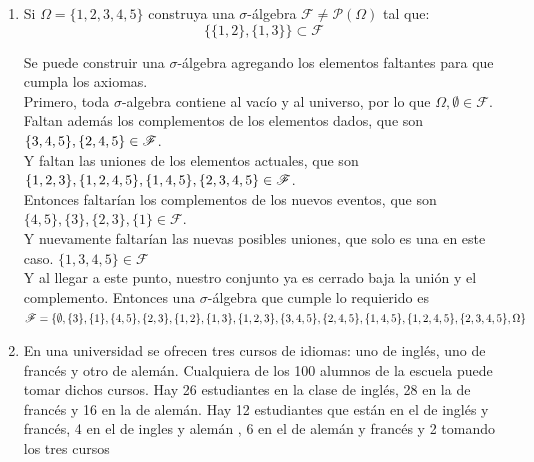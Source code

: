 \documentclass[12pt,a4paper]{report}
\begin{document}
\begin{enumerate}
{\begin{enumerate}[label=\alph*) ]
{	}



\end{enumerate}

	}

   \item {
    Si $\Omega = \lbrace 1,2,3,4,5 \rbrace$ construya una $\sigma$-álgebra $\mathcal{F} \neq \mathcal{P}(\Omega)$ tal que:\\
    $$\lbrace \lbrace 1,2 \rbrace , \lbrace 1,3 \rbrace \rbrace \subset \mathcal{F}$$

		Se puede construir una $\sigma$-álgebra agregando los elementos faltantes
		para que cumpla los axiomas.\\
		Primero, toda $\sigma$-algebra contiene al vacío y al universo, por lo que
		$\Omega, \emptyset \in \mathcal{F}$.\\
		Faltan además los complementos de los elementos dados, que son $\lbrace 3, 4, 5 \rbrace, \\
		\lbrace 2, 4, 5 \rbrace \in \mathcal{F}$.\\
		Y faltan las uniones de los elementos actuales, que son  $\lbrace 1, 2, 3 \rbrace,
		\lbrace 1, 2, 4, 5 \rbrace, \lbrace 1, 4, 5 \rbrace, \\
		\lbrace 2, 3, 4, 5 \rbrace \in \mathcal{F}$.\\
		Entonces faltarían los complementos de los nuevos eventos, que son
		$\lbrace 4, 5 \rbrace, \lbrace 3 \rbrace, \lbrace 2, 3 \rbrace, \lbrace 1 \rbrace
		\in \mathcal{F}$.\\
		Y nuevamente faltarían las nuevas posibles uniones, que solo es una en este caso.
		$\lbrace 1, 3, 4, 5 \rbrace \in \mathcal{F}$\\
		Y al llegar a este punto, nuestro conjunto ya es cerrado baja la unión y el
		complemento.
		Entonces una $\sigma$-álgebra que cumple lo requierido es\\
		$\mathcal{F} = \lbrace \emptyset,
		\lbrace 3 \rbrace, \lbrace 1 \rbrace,
		\lbrace 4, 5 \rbrace, \lbrace 2, 3 \rbrace, \lbrace 1,2 \rbrace , \lbrace 1,3 \rbrace,
		\lbrace 1, 2, 3 \rbrace, \lbrace 3, 4, 5 \rbrace, \lbrace 2, 4, 5 \rbrace, \lbrace 1, 4, 5 \rbrace, \\
		\lbrace 1, 2, 4, 5 \rbrace, \lbrace 2, 3, 4, 5 \rbrace,
		\Omega \rbrace$
	}


   \item {
   En una universidad se ofrecen tres cursos de idiomas: uno  de inglés, uno de francés y otro de alemán.
	 Cualquiera de los 100 alumnos de la escuela puede tomar dichos cursos.
	 Hay 26 estudiantes en la clase de inglés, 28 en la de francés y 16 en la de alemán.
	 Hay 12 estudiantes que están en el de inglés y francés, 4 en el de ingles y alemán ,
	 6 en el de alemán y francés y 2 tomando los tres cursos\\

}
\end{enumerate}
\end{document}
